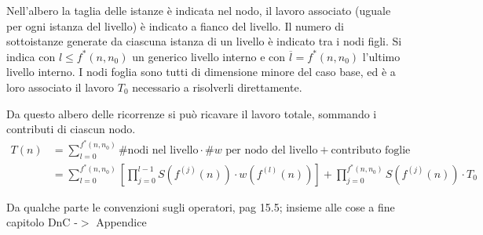 Nell'albero la taglia delle istanze è indicata nel nodo, il lavoro associato (uguale per ogni istanza del livello) è indicato a fianco del livello. Il numero di sottoistanze generate da ciascuna istanza di un livello è indicato tra i nodi figli. Si indica con $l \leq f^*(n,n_0)$ un generico livello interno e con $\overline{l} = f^*(n,n_0)$ l'ultimo livello interno. I nodi foglia sono tutti di dimensione minore del caso base, ed è a loro associato il lavoro $T_0$ necessario a risolverli direttamente.

Da questo albero delle ricorrenze si può ricavare il lavoro totale, sommando i contributi di ciascun nodo.
\begin{align*}
    T(n) & = \sum_{l=0}^{f^*(n,n_0)}\text{\# nodi nel livello}\cdot\text{\# $w$ per nodo del livello}+\text{contributo foglie}\\
    &= \sum_{l=0}^{f^*(n,n_0)} \left[ \prod_{j=0}^{l-1} S \left( f^{(j)}(n) \right) \cdot w \left( f^{(l)}(n) \right) \right] +
        \prod_{j=0}^{f^*(n,n_0)} S \left( f^{(j)}(n) \right) \cdot T_0
\end{align*}

Da qualche parte le convenzioni sugli operatori, pag 15.5; insieme alle cose a fine capitolo DnC -$>$ Appendice

